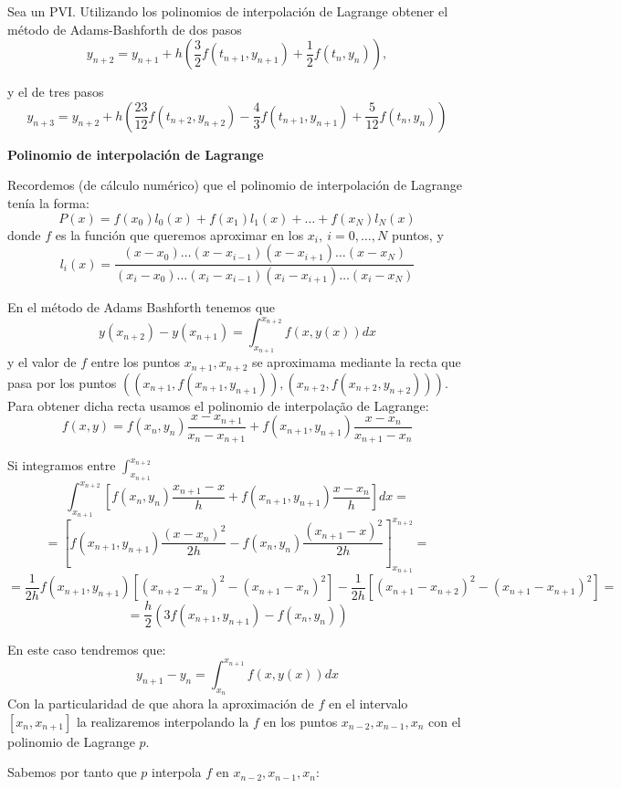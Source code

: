 \begin{problem}[6]
	\ppart Sea un PVI. Utilizando los polinomios de interpolación de Lagrange obtener el método de Adams-Bashforth de dos pasos
	\[y_{n+2} = y_{n+1} + h \left( \frac{3}{2}f(t_{n+1}, y_{n+1}) + \frac{1}{2}f(t_n,y_n) \right),\]
	
	\ppart y el de tres pasos
	\[y_{n+3} = y_{n+2} + h \left( \frac{23}{12} f(t_{n+2},y_{n+2}) - \frac{4}{3} f(t_{n+1}, y_{n+1}) + \frac{5}{12}f(t_n,y_n) \right)\]
	
	\solution
	\begin{defn}{\textbf{Polinomio de interpolación de Lagrange}}

		Recordemos (de cálculo numérico) que el polinomio de interpolación de Lagrange tenía la forma:
		\[P(x) = f(x_0)l_0(x) + f(x_1)l_1(x) + … + f(x_N)l_N(x)\]
		donde $f$ es la función que queremos aproximar en los $x_i,\ i=0,…,N$ puntos, y
		\[l_i(x) = \frac{(x-x_0) … (x-x_{i-1}) (x-x_{i+1}) … (x-x_N)}{(x_i-x_0) … (x_i-x_{i-1}) (x_i-x_{i+1}) … (x_i-x_N)}\]
	\end{defn}

	\spart
	En el método de Adams Bashforth tenemos que
	\[y(x_{n+2})-y(x_{n+1}) = \int_{x_{n+1}}^{x_{n+2}} f(x,y(x)) dx\]
	y el valor de $f$ entre los puntos $x_{n+1}, x_{n+2}$ se aproximama mediante la recta que pasa por los puntos $((x_{n+1},f(x_{n+1},y_{n+1})), (x_{n+2}, f(x_{n+2},y_{n+2})))$. Para obtener dicha recta usamos el polinomio de interpolação de Lagrange:
	\[f(x,y) = f(x_n,y_n)\frac{x-x_{n+1}}{x_n-x_{n+1}} + f(x_{n+1},y_{n+1}) \frac{x-x_n}{x_{n+1}-x_n}\]

	Si integramos entre $\int_{x_{n+1}}^{x_{n+2}}$
	\[\int_{x_{n+1}}^{x_{n+2}} \left[ f(x_n,y_n)\frac{x_{n+1}-x}{h} + f(x_{n+1},y_{n+1})\frac{x-x_n}{h} \right]dx =\]
	\[= \left[ f(x_{n+1},y_{n+1}) \frac{(x-x_n)^2}{2h} - f(x_n,y_n)\frac{(x_{n+1}-x)^2}{2h} \right]_{x_{n+1}}^{x_{n+2}}  =\]
	\[= \frac{1}{2h}f(x_{n+1},y_{n+1}) \left[ (x_{n+2}-x_n)^2 - (x_{n+1}-x_n)^2 \right] - \frac{1}{2h} \left[ (x_{n+1} - x_{n+2})^2 - (x_{n+1} - x_{n+1})^2 \right] =\]
	\[= \frac{h}{2} \left( 3f(x_{n+1},y_{n+1}) - f(x_n,y_n) \right)\]


	\spart
	En este caso tendremos que:
	\[y_{n+1} - y_n = \int_{x_n}^{x_{n+1}} f(x,y(x)) dx\]
	Con la particularidad de que ahora la aproximación de $f$ en el intervalo $[x_n,x_{n+1}]$ la realizaremos interpolando la $f$ en los puntos $x_{n-2},x_{n-1},x_n$ con el polinomio de Lagrange $p$.

	Sabemos por tanto que $p$ interpola $f$ en $x_{n-2},x_{n-1},x_n$:


\end{problem}
